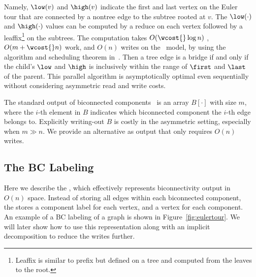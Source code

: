 Namely, $\low(v)$ and $\high(v)$ indicate the first and last vertex
on the Euler tour that are connected by a nontree edge to the subtree rooted
at $v$.  The $\low(\cdot)$ and $\high(\cdot)$ values
can be computed by a reduce on each vertex followed by a leaffix\footnote{Leaffix is similar to prefix but defined on a tree and computed from the leaves to the root.} on
the subtrees.  The computation takes $O(\wcost{}\log n)$ \depth,
$O(m+\wcost{}n)$ work, and $O(n)$ writes on the \ourmodel\ model, by using the algorithm
and scheduling theorem in~\cite{BBFGGMS16}.  Then a tree edge is a
bridge if and only if the child's $\low$ and $\high$ is inclusively
within the range of $\first$ and $\last$ of the parent.
This parallel algorithm is asymptotically optimal even sequentially without considering asymmetric read and write costs.

The standard output of biconnected components~\cite{CLRS,JaJa92}
is an array $B[\cdot]$ with size $m$, where the $i$-th element in $B$
indicates which biconnected component the $i$-th edge belongs to.
Explicitly writing-out $B$ is costly in the asymmetric setting,
especially when $m\gg n$.
We provide an alternative
\imprep{} as output that only requires $O(n)$ writes.

\subsection{The BC Labeling}\label{sec:imprep}\label{sec:biconn-linear}



Here we describe the ,
which effectively represents biconnectivity output in $O(n)$ space.
Instead of storing all edges within each biconnected
component, the \imprep{} stores a component label for each vertex, and a vertex
for each component.
An example of a BC labeling of a graph is shown in Figure~\ref{fig:eulertour}.
We will later show how to use this representation
along with an implicit decomposition to reduce the writes further.


